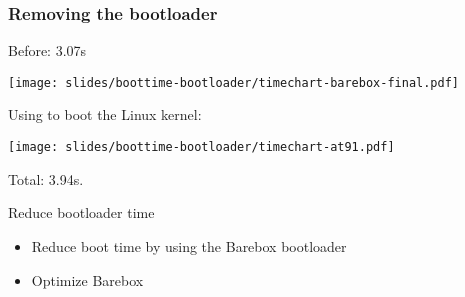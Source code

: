 \begin{frame}
\frametitle{Removing the bootloader}
Before: 3.07s
\begin{center}
    \texttt{[image: slides/boottime-bootloader/timechart-barebox-final.pdf]}
\end{center}
Using  to boot the Linux kernel:
\begin{center}
    \texttt{[image: slides/boottime-bootloader/timechart-at91.pdf]}
\end{center}
Total: 3.94s.
\end{frame}

\setuplabframe
{Reduce bootloader time}
{
\begin{itemize}
\item Reduce boot time by using the Barebox bootloader
\item Optimize Barebox
\end{itemize}
}

